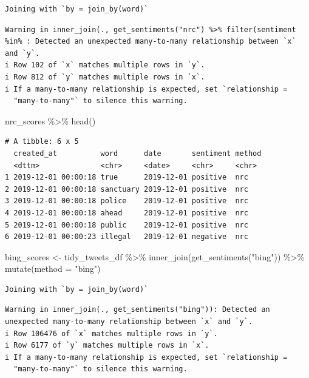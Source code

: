 \documentclass[
  letterpaper,
  DIV=11,
  numbers=noendperiod]{scrreprt}
\newenvironment{Shaded}{\begin{snugshade}}{\end{snugshade}}
\newcommand{\AttributeTok}[1]{\textcolor[rgb]{0.40,0.45,0.13}{#1}}
\newcommand{\FunctionTok}[1]{\textcolor[rgb]{0.28,0.35,0.67}{#1}}
\newcommand{\NormalTok}[1]{\textcolor[rgb]{0.00,0.23,0.31}{#1}}
\newcommand{\OtherTok}[1]{\textcolor[rgb]{0.00,0.23,0.31}{#1}}
\newcommand{\SpecialCharTok}[1]{\textcolor[rgb]{0.37,0.37,0.37}{#1}}
\newcommand{\StringTok}[1]{\textcolor[rgb]{0.13,0.47,0.30}{#1}}
\begin{document}
\begin{verbatim}
Joining with `by = join_by(word)`
\end{verbatim}

\begin{verbatim}
Warning in inner_join(., get_sentiments("nrc") %>% filter(sentiment %in% : Detected an unexpected many-to-many relationship between `x` and `y`.
i Row 102 of `x` matches multiple rows in `y`.
i Row 812 of `y` matches multiple rows in `x`.
i If a many-to-many relationship is expected, set `relationship =
  "many-to-many"` to silence this warning.
\end{verbatim}

\begin{Shaded}
\begin{Highlighting}[]
\NormalTok{nrc\_scores }\SpecialCharTok{\%\textgreater{}\%} \FunctionTok{head}\NormalTok{()}
\end{Highlighting}
\end{Shaded}

\begin{verbatim}
# A tibble: 6 x 5
  created_at          word      date       sentiment method
  <dttm>              <chr>     <date>     <chr>     <chr> 
1 2019-12-01 00:00:18 true      2019-12-01 positive  nrc   
2 2019-12-01 00:00:18 sanctuary 2019-12-01 positive  nrc   
3 2019-12-01 00:00:18 police    2019-12-01 positive  nrc   
4 2019-12-01 00:00:18 ahead     2019-12-01 positive  nrc   
5 2019-12-01 00:00:18 public    2019-12-01 positive  nrc   
6 2019-12-01 00:00:23 illegal   2019-12-01 negative  nrc   
\end{verbatim}

\begin{Shaded}
\begin{Highlighting}[]
\NormalTok{bing\_scores }\OtherTok{\textless{}{-}}\NormalTok{ tidy\_tweets\_df }\SpecialCharTok{\%\textgreater{}\%}
  \FunctionTok{inner\_join}\NormalTok{(}\FunctionTok{get\_sentiments}\NormalTok{(}\StringTok{"bing"}\NormalTok{)) }\SpecialCharTok{\%\textgreater{}\%}
    \FunctionTok{mutate}\NormalTok{(}\AttributeTok{method =} \StringTok{"bing"}\NormalTok{)}
\end{Highlighting}
\end{Shaded}

\begin{verbatim}
Joining with `by = join_by(word)`
\end{verbatim}

\begin{verbatim}
Warning in inner_join(., get_sentiments("bing")): Detected an unexpected many-to-many relationship between `x` and `y`.
i Row 106476 of `x` matches multiple rows in `y`.
i Row 6177 of `y` matches multiple rows in `x`.
i If a many-to-many relationship is expected, set `relationship =
  "many-to-many"` to silence this warning.
\end{verbatim}
\end{document}
